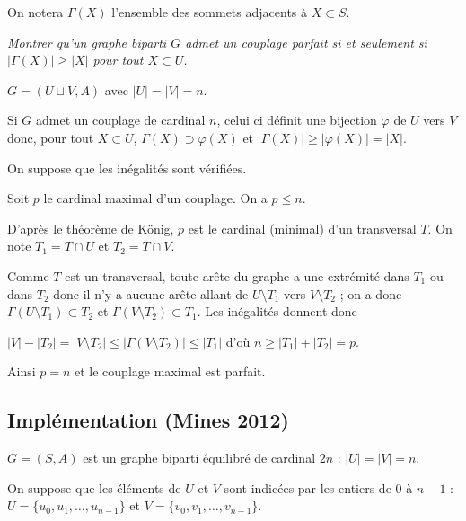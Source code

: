 On notera $\Gamma(X)$ l'ensemble des sommets adjacents à $X \subset S$.
\begin{Exercise}[title=Théorème de Hall]\it
Montrer qu'un graphe biparti $G$ admet un couplage parfait si et seulement si $|\Gamma(X)| \ge |X|$ pour tout $X\subset U$.
\end{Exercise}
\begin{Answer}
$G = (U\sqcup V, A)$ avec $|U| = |V|=n$.

Si $G$ admet un couplage de cardinal $n$, celui ci définit une bijection $\varphi$ de $U$ vers $V$ donc, pour tout $X\subset U$, $\Gamma(X) \supset \varphi(X)$ et $|\Gamma(X)| \ge |\varphi(X)|=|X|$.

\medskip

On suppose que les inégalités sont vérifiées.

Soit $p$ le cardinal maximal d'un couplage. On a $p\le n$.

D'après le théorème de König, $p$ est le cardinal (minimal) d'un transversal $T$. On note $T_1=T\cap U$ et $T_2=T\cap V$.

Comme $T$ est un transversal, toute arête du graphe a une extrémité dans $T_1$ ou dans $T_2$ donc il n'y a aucune arête allant de $U\setminus T_1$ vers $V\setminus T_2$ ; on a donc $\Gamma(U\setminus T_1) \subset T_2$ et $\Gamma(V\setminus T_2) \subset T_1$. Les inégalités donnent donc

$|V| - |T_2| = |V\setminus T_2| \le |\Gamma(V\setminus T_2)| \le |T_1|$ d'où 
$n \ge |T_1| + |T_2| = p$.

Ainsi $p = n$ et le couplage maximal est parfait.
\end{Answer}
\subsection{Implémentation (Mines 2012)}
$G = (S, A)$ est un graphe biparti équilibré de cardinal $2n$ : $|U| = |V| = n$.

On suppose que les éléments de $U$ et $V$ sont indicées par les entiers de 0 à $n-1$ :
$U = \{u_0, u_1, \ldots, u_{n-1}\}$ et  $V = \{v_0, v_1, \ldots, v_{n-1}\}$.


